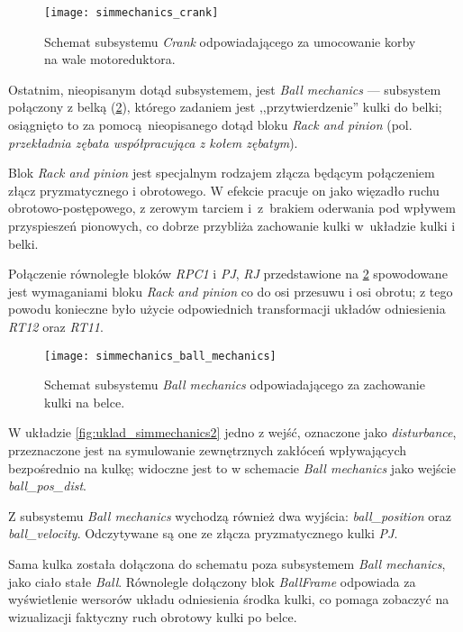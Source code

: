 \begin{figure}[h]
    \centering
    \texttt{[image: simmechanics\_crank]}
    \caption{Schemat subsystemu \textit{Crank} odpowiadającego za umocowanie korby na wale motoreduktora.}
    \label{fig:sm_crank}
\end{figure}

Ostatnim, nieopisanym dotąd subsystemem, jest \textit{Ball mechanics} --- subsystem połączony z belką (\cref{fig:sm_ball_mechanics}), którego zadaniem jest ,,przytwierdzenie'' kulki do belki; osiągnięto to za pomocą nieopisanego dotąd bloku \textit{Rack and pinion} (pol. \textit{przekładnia zębata współpracująca z kołem zębatym}).

Blok \textit{Rack and pinion} jest specjalnym rodzajem złącza będącym połączeniem złącz pryzmatycznego i obrotowego. W efekcie pracuje on jako więzadło ruchu obrotowo-postępowego, z zerowym tarciem i~z~brakiem oderwania pod wpływem przyspieszeń pionowych, co dobrze przybliża zachowanie kulki w~układzie kulki i belki.

Połączenie równoległe bloków \textit{RPC1} i \textit{PJ}, \textit{RJ} przedstawione na \cref{fig:sm_ball_mechanics} spowodowane jest wymaganiami bloku \textit{Rack and pinion} co do osi przesuwu i osi obrotu; z tego powodu konieczne było użycie odpowiednich transformacji układów odniesienia \textit{RT12} oraz \textit{RT11}.

\begin{figure}[h]
    \centering
    \texttt{[image: simmechanics\_ball\_mechanics]}
    \caption{Schemat subsystemu \textit{Ball mechanics} odpowiadającego za zachowanie kulki na belce.}
    \label{fig:sm_ball_mechanics}
\end{figure}

W układzie \cref{fig:uklad_simmechanics2} jedno z wejść, oznaczone jako \textit{disturbance}, przeznaczone jest na symulowanie zewnętrznych zakłóceń wpływających bezpośrednio na kulkę; widoczne jest to w schemacie \textit{Ball mechanics} jako wejście \textit{ball\_pos\_dist}.

Z subsystemu \textit{Ball mechanics} wychodzą również dwa wyjścia: \textit{ball\_position} oraz \textit{ball\_velocity}. Odczytywane są one ze złącza pryzmatycznego kulki \textit{PJ}.

Sama kulka została dołączona do schematu poza subsystemem \textit{Ball mechanics}, jako ciało stałe \textit{Ball}. Równolegle dołączony blok \textit{BallFrame} odpowiada za wyświetlenie wersorów układu odniesienia środka kulki, co pomaga zobaczyć na wizualizacji faktyczny ruch obrotowy kulki po belce.

